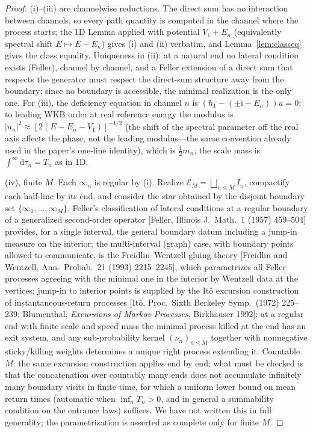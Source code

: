\documentclass[11pt]{article}
\theoremstyle{remark}
\newcommand{\dd}{\mathrm{d}}
\newcommand{\calE}{\mathcal{E}}
\newcommand{\ii}{\mathrm{i}}
\begin{document}
\begin{proof}
(i)--(iii) are channelwise reductions.  The direct sum has no
interaction between channels, so every path quantity is computed in the
channel where the process starts; the 1D Lemma applied with potential
$V_{1}+E_{n}$ (equivalently spectral shift $E\mapsto E-E_{n}$) gives
(i) and (ii) verbatim, and Lemma~\ref{lem:classeq} gives the class
equality.  Uniqueness in (ii): at a natural end no lateral condition
exists (Feller), channel by channel, and a Feller extension of a direct
sum that respects the generator must respect the direct-sum structure
away from the boundary; since no boundary is accessible, the minimal
realization is the only one.  For (iii), the deficiency equation in
channel $n$ is $(h_{1}-(\pm\ii-E_{n}))u=0$; to leading WKB order at
real reference energy the modulus is
$|u_{n}|^{2}\approx[2(E-E_{n}-V_{1})]^{-1/2}$ (the shift of the
spectral parameter off the real axis affects the phase, not the leading
modulus---the same convention already used in the paper's one-line
identity), which is $\tfrac12 m_{n}$; the scale mass is
$\int^{\infty}\dd\tau_{n}=T_{n}$ as in 1D.

(iv), finite $M$.  Each $\infty_{n}$ is regular by (i).  Realize
$\calE_{M}=\bigsqcup_{n\le M}I_{n}$, compactify each half-line by its
end, and consider the star obtained by the disjoint boundary set
$\{\infty_{1},\dots,\infty_{M}\}$.  Feller's classification of lateral
conditions at a regular boundary of a generalized second-order operator
[Feller, Illinois J.\ Math.\ 1 (1957) 459--504] provides, for a single
interval, the general boundary datum including a jump-in measure on the
interior; the multi-interval (graph) case, with boundary points allowed
to communicate, is the Freidlin--Wentzell gluing theory [Freidlin and
Wentzell, Ann.\ Probab.\ 21 (1993) 2215--2245], which parametrizes all
Feller processes agreeing with the minimal one in the interior by
Wentzell data at the vertices; jump-in to interior points is supplied by
the It\^o excursion construction of instantaneous-return processes
[It\^o, Proc.\ Sixth Berkeley Symp.\ (1972) 225--239; Blumenthal,
\emph{Excursions of Markov Processes}, Birkh\"auser 1992]: at a regular
end with finite scale and speed mass the minimal process killed at the
end has an exit system, and any sub-probability kernel
$(\nu_{n})_{n\le M}$ together with nonnegative sticky/killing weights
determines a unique right process extending it.  Countable $M$: the
same excursion construction applies end by end; what must be checked is
that the concatenation over countably many ends does not accumulate
infinitely many boundary visits in finite time, for which a uniform
lower bound on mean return times (automatic when
$\inf_{n} T_{n}>0$, and in general a summability condition on the
entrance laws) suffices.  We have not written this in full generality;
the parametrization is asserted as complete only for finite $M$.
\end{proof}
\end{document}
